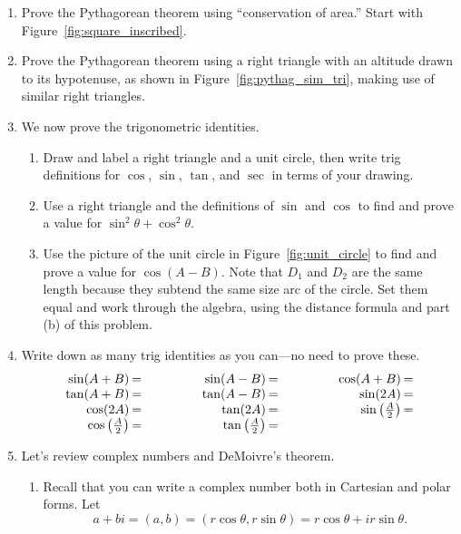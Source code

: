 \documentclass[../textbook.tex]{subfiles}
\begin{document}
\begin{enumerate}
\item Prove the Pythagorean theorem using ``conservation of area.'' Start with Figure~\ref{fig:square_inscribed}.
\item Prove the Pythagorean theorem using a right triangle with an altitude drawn to its hypotenuse, as shown in Figure~\ref{fig:pythag_sim_tri}, making use of similar right triangles.
\item We now prove the trigonometric identities.
\begin{enumerate}
\item Draw and label a right triangle and a unit circle, then write trig definitions for $\cos$, $\sin$, $\tan$, and $\sec$ in terms of your drawing.
\item Use a right triangle and the definitions of $\sin$ and $\cos$ to find and prove a value for $\sin^2 \theta + \cos^2 \theta$.
\item Use the picture of the unit circle in Figure~\ref{fig:unit_circle} to find and prove a value for $\cos(A-B)$. Note that $D_1$ and $D_2$ are the same length because they subtend the same size arc of the circle. Set them equal and work through the algebra, using the distance formula and part (b) of this problem.
\end{enumerate}
\item Write down as many trig identities as you can---no need to prove these.
\renewcommand{\arraystretch}{1.1}
$$\arraycolsep=1pt\begin{array}{rlrlrl}
\sin(A+B)&=\qquad\qquad\phantom{.}&\sin(A-B) &=\qquad\qquad\phantom{.}&\cos(A+B) &= \\
\tan(A+B)&= &\tan(A-B) &= &\sin(2A) &= \\
\cos(2A)&= &\tan(2A) &= &\sin\left(\frac{A}{2}\right) &= \\
\cos\left(\frac{A}{2}\right)&= &\tan\left(\frac{A}{2}\right) &= & & \\
\end{array}$$

\item Let's review complex numbers and DeMoivre's theorem.
\begin{enumerate}
\item Recall that you can write a complex number both in Cartesian and polar forms. Let
\[a+bi=(a,b)=(r\cos\theta,r\sin\theta)=r\cos\theta+ir\sin\theta.\]


\end{enumerate}
\end{enumerate}
\end{document}
